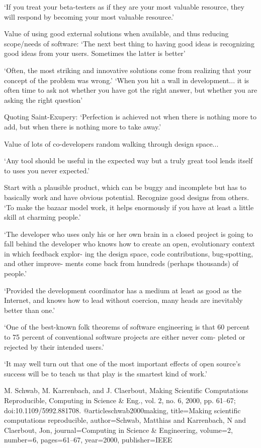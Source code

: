 \documentclass[12pt]{amsart}
\begin{document}
`If you treat your beta-testers as if they are your most valuable resource, they will respond by becoming your most valuable resource.'

Value of using good external solutions when available, and thus reducing scope/needs of software: `The next best thing to having good ideas is recognizing good ideas from your users. Sometimes the latter is better'

`Often, the most striking and innovative solutions come from realizing that your concept of the problem was wrong.' `When you hit a wall in development... it is often time to ask not whether you have got the right answer, but whether you are asking the right question'

Quoting Saint-Exupery: `Perfection is achieved not when there is nothing more to add, but when there is nothing more to take away.'

Value of lots of co-developers random walking through design space...

`Any tool should be useful in the expected way but a truly great tool lends itself to uses you never expected.'

Start with a plausible product, which can be buggy and incomplete but has to basically work and have obvious potential. Recognize good designs from others. `To make the bazaar model work, it helps enormously if you have at least a little skill at charming people.'

`The developer who uses only his or her own brain in a closed project is going to fall behind the developer who knows how to create an open, evolutionary context in which feedback explor- ing the design space, code contributions, bug-spotting, and other improve- ments come back from hundreds (perhaps thousands) of people.'

`Provided the development coordinator has a medium at least as good as the Internet, and knows how to lead without coercion, many heads are inevitably better than one.'

`One of the best-known folk theorems of software engineering is that 60 percent to 75 percent of conventional software projects are either never com- pleted or rejected by their intended users.'

`It may well turn out that one of the most important effects of open source's success will be to teach us that play is the smartest kind of work.'



M. Schwab, M. Karrenbach, and J. Claerbout, Making Scientific Computations Reproducible, Computing in Science \& Eng., vol. 2, no. 6, 2000, pp. 61--67; doi:10.1109/5992.881708.
@article{schwab2000making,
  title={Making scientific computations reproducible},
  author={Schwab, Matthias and Karrenbach, N and Claerbout, Jon},
  journal={Computing in Science \& Engineering},
  volume={2},
  number={6},
  pages={61--67},
  year={2000},
  publisher={IEEE}
}
\end{document}
